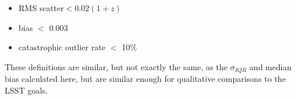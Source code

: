 \begin{itemize}
\item RMS scatter$ < 0.02(1+z)$
\item bias $<$ 0.003 %
\item catastrophic outlier rate $<$ 10\% %
\end{itemize}
These definitions are similar, but not exactly the same, as the $\sigma_{IQR}$ and median bias calculated here, but are similar enough for qualitative comparisons to the LSST goals.


